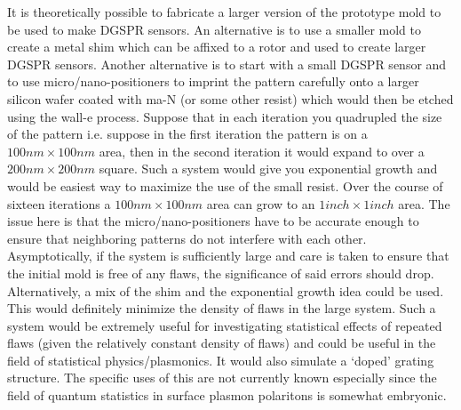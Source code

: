 It is theoretically possible to fabricate a larger version of the prototype mold to be used to make DGSPR sensors. An alternative is to use a smaller mold to create a metal shim which can be affixed to a rotor and used to create larger DGSPR sensors. Another alternative is to start with a small DGSPR sensor and to use micro/nano-positioners to imprint the pattern carefully onto a larger silicon wafer coated with ma-N (or some other resist) which would then be etched using the wall-e process. Suppose that in each iteration you quadrupled the size of the pattern i.e. suppose in the first iteration the pattern is on a $100 nm \times 100 nm$ area, then in the second iteration it would expand to over a $200 nm \times 200 nm$ square. Such a system would give you exponential growth and would be easiest way to maximize the use of the small resist. Over the course of sixteen iterations a $100 nm \times 100 nm$ area can grow to an $1 inch \times 1 inch$ area. The issue here is that the micro/nano-positioners have to be accurate enough to ensure that neighboring patterns do not interfere with each other. Asymptotically, if the system is sufficiently large and care is taken to ensure that the initial mold is free of any flaws, the significance of said errors should drop. Alternatively, a mix of the shim and the exponential growth idea could be used. This would definitely minimize the density of flaws in the large system. Such a system would be extremely useful for investigating statistical effects of repeated flaws (given the relatively constant density of flaws) and could be useful in the field of statistical physics/plasmonics. It would also simulate a `doped' grating structure. The specific uses of this are not currently known especially since the field of quantum statistics in surface plasmon polaritons \cite{quantum} is somewhat embryonic. 